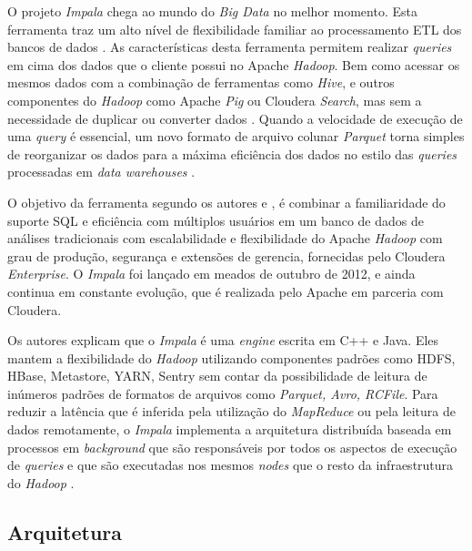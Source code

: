         O projeto \textit{Impala} chega ao mundo do \textit{Big Data} no melhor momento. Esta ferramenta traz um alto nível
        de flexibilidade familiar ao processamento ETL dos bancos de dados \cite{russell2013}. As características desta ferramenta
        permitem realizar \textit{queries} em cima dos dados que o cliente possui no Apache \textit{Hadoop}. Bem como acessar
        os mesmos dados com a combinação de ferramentas como \textit{Hive}, e outros componentes do \textit{Hadoop} como
        Apache \textit{Pig} ou Cloudera \textit{Search}, mas sem a necessidade de duplicar ou converter dados \cite{chauhan2013}.
        Quando a velocidade de execução de uma \textit{query} é essencial, um novo formato de arquivo colunar \textit{Parquet}
        torna simples de reorganizar os dados para a máxima eficiência dos dados no estilo das \textit{queries} processadas em
        \textit{data warehouses} \cite{bittorf2015}.

        O objetivo da ferramenta segundo os autores  e , é combinar a
        familiaridade do suporte SQL e eficiência com múltiplos usuários em um banco de dados de análises tradicionais com
        escalabilidade e flexibilidade do Apache \textit{Hadoop} com grau de produção, segurança e extensões de gerencia,
        fornecidas pelo Cloudera \textit{Enterprise}. O \textit{Impala} foi lançado em meados de outubro de 2012, e ainda continua
        em constante evolução, que é realizada pelo Apache em parceria com Cloudera.

        Os autores  explicam que o \textit{Impala} é uma \textit{engine} escrita em C++ e Java. Eles
        mantem a flexibilidade do \textit{Hadoop} utilizando componentes padrões como HDFS, HBase, Metastore, YARN,
        Sentry sem contar da possibilidade de leitura de inúmeros padrões de formatos de arquivos como \textit{Parquet, Avro, RCFile}.
        Para reduzir a latência que é inferida pela utilização do \textit{MapReduce} ou pela leitura de dados remotamente, o
        \textit{Impala} implementa a arquitetura distribuída baseada em processos em \textit{background} que são responsáveis
        por todos os aspectos de execução de \textit{queries} e que são executadas nos mesmos \textit{nodes} que o resto da
        infraestrutura do \textit{Hadoop} \cite{chauhan2013}.

        \subsection{Arquitetura}

